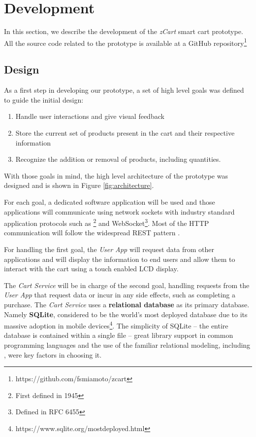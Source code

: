 \documentclass[openright]{normas-utf-tex} %
\begin{document}
\chapter{Development}
\label{chap:desenv}

In this section, we describe the development of the \textit{zCart} smart cart
prototype. All the source code related to the prototype is available at a
GitHub repository\footnote{https://github.com/fsmiamoto/zcart}

\section{Design}
\label{sec:design}

As a first step in developing our prototype, a set of
high level goals was defined to guide the initial design:

\begin{enumerate}
    \item Handle user interactions and give visual feedback
    \item Store the current set of products present in the cart and their respective information
    \item Recognize the addition or removal of products, including quantities.
\end{enumerate}

With those goals in mind, the high level architecture of the prototype
was designed and is shown in Figure \ref{fig:architecture}.

For each goal, a dedicated software application will be used and those
applications will communicate using 
network sockets \cite{Kurose2013} with industry standard application protocols such as
\footnote{First defined in
 1945} and WebSocket\footnote{Defined in RFC 6455}.
Most of the HTTP communication will follow the widespread REST pattern \cite{Roy2000}.

For handling the first goal, the \textit{User App} will request data
from other applications and will display the information to end users and allow
them to interact with the cart using a touch enabled LCD display. 

The \textit{Cart Service} will be in charge of the second goal,
handling requests from the \textit{User App} that request data or incur in any
side effects, such as completing a purchase. The \textit{Cart Service} uses a
\textbf{relational database} \cite{Silberschatz2010} as its primary database. Namely
\textbf{SQLite}, considered to be the world's most deployed database due to its
massive adoption in mobile
devices\footnote{https://www.sqlite.org/mostdeployed.html}. The simplicity of
SQLite -- the entire database is contained within a single file -- great
library support in common programming languages and the use of the familiar
relational modeling, including 
\cite{Nield2016}, were key factors in choosing it.
\end{document}
